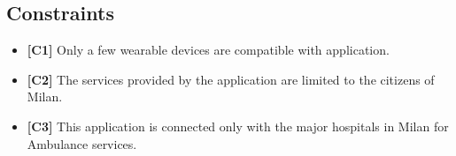 \subsection{Constraints}
\begin{itemize}
\item{\textbf{[C1]}} Only a few wearable devices are compatible with application.
\item{\textbf{[C2]}} The services provided by the application are limited to the citizens of Milan.
\item{\textbf{[C3]}} This application is connected only with the major hospitals in Milan for Ambulance services.
\end{itemize}
